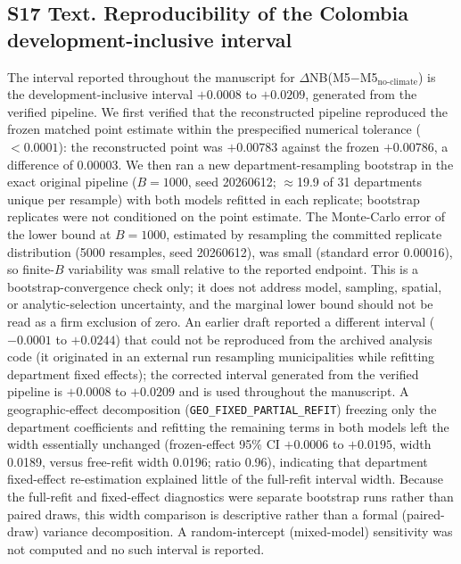 \documentclass[11pt,a4paper]{article}
\begin{document}
\subsection*{S17 Text. Reproducibility of the Colombia development-inclusive interval}
The interval reported throughout the manuscript for $\Delta$NB(M5$-$M5$_{\text{no-climate}}$) is the development-inclusive interval $+0.0008$ to $+0.0209$, generated from the verified pipeline. We first verified that the reconstructed pipeline reproduced the frozen matched point estimate within the prespecified numerical tolerance ($<0.0001$): the reconstructed point was $+0.00783$ against the frozen $+0.00786$, a difference of $0.00003$. We then ran a new department-resampling bootstrap in the exact original pipeline ($B=1000$, seed 20260612; $\approx$19.9 of 31 departments unique per resample) with both models refitted in each replicate; bootstrap replicates were not conditioned on the point estimate. The Monte-Carlo error of the lower bound at $B=1000$, estimated by resampling the committed replicate distribution (5000 resamples, seed 20260612), was small (standard error $0.00016$), so finite-$B$ variability was small relative to the reported endpoint. This is a bootstrap-convergence check only; it does not address model, sampling, spatial, or analytic-selection uncertainty, and the marginal lower bound should not be read as a firm exclusion of zero. An earlier draft reported a different interval ($-0.0001$ to $+0.0244$) that could not be reproduced from the archived analysis code (it originated in an external run resampling municipalities while refitting department fixed effects); the corrected interval generated from the verified pipeline is $+0.0008$ to $+0.0209$ and is used throughout the manuscript. A geographic-effect decomposition (\texttt{GEO\_FIXED\_PARTIAL\_REFIT}) freezing only the department coefficients and refitting the remaining terms in both models left the width essentially unchanged (frozen-effect 95\% CI $+0.0006$ to $+0.0195$, width 0.0189, versus free-refit width 0.0196; ratio 0.96), indicating that department fixed-effect re-estimation explained little of the full-refit interval width. Because the full-refit and fixed-effect diagnostics were separate bootstrap runs rather than paired draws, this width comparison is descriptive rather than a formal (paired-draw) variance decomposition. A random-intercept (mixed-model) sensitivity was not computed and no such interval is reported.
\end{document}
